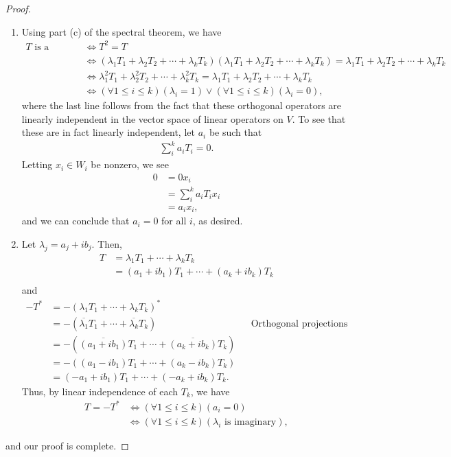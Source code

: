 \documentclass[10pt,a4paper]{article}
\theoremstyle{definition}
\begin{document}
\begin{proof}
\begin{enumerate}
\item Using part (c) of the spectral theorem, we have
\begin{align*}
T \text{ is a projection} &\iff T^2 = T \\
&\iff (\lambda_1 T_1 + \lambda_2 T_2 + \cdots + \lambda_k T_k)(\lambda_1 T_1 + \lambda_2 T_2 + \cdots + \lambda_k T_k) = \lambda_1 T_1 + \lambda_2 T_2 + \cdots + \lambda_k T_k\\
&\iff \lambda^2_1 T_1 + \lambda^2_2 T_2 + \cdots + \lambda^2_k T_k = \lambda_1 T_1 + \lambda_2 T_2 + \cdots + \lambda_k T_k\\
&\iff (\forall 1 \leq i \leq k)(\lambda_i = 1) \lor (\forall 1 \leq i \leq k)(\lambda_i = 0),
\end{align*}
where the last line follows from the fact that these orthogonal operators are linearly independent in the vector space of linear operators on $V$. To see that these are in fact linearly independent, let $a_i$ be such that 
\begin{align*}
\sum_i^k a_iT_i = 0.
\end{align*}
Letting $x_i \in W_i$ be nonzero, we see
\begin{align*}
0 &= 0x_i\\
&= \sum_i^k a_iT_i x_i\\
&= a_i x_i,
\end{align*}
and we can conclude that $a_i = 0$ for all $i$, as desired.

\item Let $\lambda_j = a_j + ib_j$. Then,
\begin{align*}
T &= \lambda_1 T_1  + \cdots + \lambda_k T_k\\
&= (a_1 + ib_1) T_1  + \cdots + (a_k + ib_k) T_k\\
\end{align*}
and
\begin{align*}
-T^* &= -(\lambda_1 T_1  + \cdots + \lambda_k T_k)^*\\
&= -(\overline{\lambda_1} T_1  + \cdots + \overline{\lambda_k} T_k) && \text{Orthogonal projections are hermitian}\\
&= -(\overline{(a_1 + ib_1)} T_1  + \cdots + \overline{(a_k + ib_k)} T_k)\\
&= -((a_1 - ib_1) T_1  + \cdots + (a_k - ib_k) T_k)\\
&= (-a_1 + ib_1) T_1  + \cdots + (-a_k + ib_k) T_k.
\end{align*}
Thus, by linear independence of each $T_k$, we have 
\begin{align*}
T = -T^* &\iff (\forall 1 \leq i \leq k)(a_i = 0)\\
&\iff (\forall 1 \leq i \leq k)(\lambda_i \text{ is imaginary}),
\end{align*}
\end{enumerate}
and our proof is complete.
\end{proof}
\end{document}
